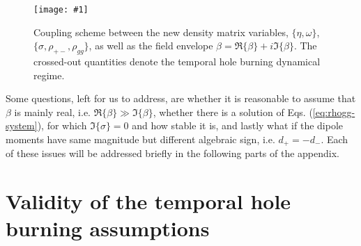 \documentclass[onecolumn,secnumarabic,amssymb, nobibnotes, aip, prd]{revtex4-1}
\newcommand{\includegraphicsM}[1]{\texttt{[image: \#1]}}
\begin{document}
\begin{appendices}
\begin{figure}[h!]
	\begin{center}
		\includegraphicsM{IMGS/couplingscheme.eps}
		\caption{Coupling scheme between the new density matrix variables, $\{\eta,\omega\}$, $\{\sigma, \rho_{+-},\rho_{gg}\}$, as well as the field envelope $\beta = \Re\{\beta\}+i\Im\{\beta\}$. The crossed-out quantities denote the temporal hole burning dynamical regime.} \label{fig:coupling}
	\end{center}	
\end{figure}

Some questions, left for us to address, are whether it is reasonable to assume that $\beta$ is mainly real, i.e. $\Re\{\beta\} \gg \Im\{\beta\}$, whether there is a solution of Eqs. (\ref{eq:rhogg-system}), for which $\Im\{\sigma\} = 0$ and how stable it is, and lastly what if the dipole moments have same magnitude but different algebraic sign, i.e. $d_+ = -d_-$. Each of these issues will be addressed briefly in the following parts of the appendix.  
\section{Validity of the temporal hole burning assumptions}
\label{sec:sup-validity}

\end{appendices}
\end{document}
